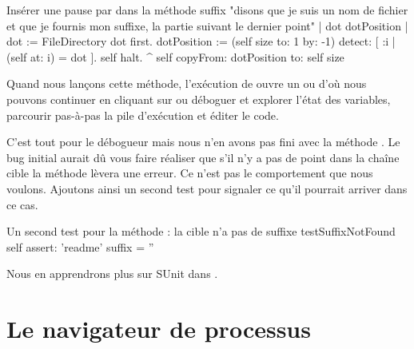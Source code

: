 \documentclass[a4paper,10pt,twoside]{book}
\begin{document}
\needspace{11ex}
\begin{method}[suffix]{Insérer une pause par  dans la méthode }
suffix
	"disons que je suis un nom de fichier et que je fournis mon suffixe, la partie suivant le dernier point"
	| dot dotPosition |
	dot := FileDirectory dot first.
	dotPosition := (self size to: 1 by: -1) detect: [ :i | (self at: i) = dot ].
	self halt.
	^ self copyFrom: dotPosition to: self size 
\end{method}

Quand nous lançons cette méthode, l'exécution de  ouvre 
un  ou \emph{} d'où nous pouvons continuer 
en cliquant sur 
ou déboguer et explorer l'état des variables, parcourir pas-à-pas la pile d'exécution et éditer le code.

C'est tout pour le débogueur mais nous n'en avons pas fini avec la méthode .
Le bug initial aurait dû vous faire réaliser que s'il n'y a pas de point dans la chaîne 
cible la méthode  lèvera une erreur.
Ce n'est pas le comportement que nous voulons. Ajoutons ainsi un second test
pour signaler ce qu'il pourrait arriver dans ce cas.  

\begin{method}[testNoSuffix]{Un second test pour la méthode : la cible n'a pas de suffixe}
testSuffixNotFound
	self assert: 'readme' suffix = ''
\end{method}


Nous en apprendrons plus sur SUnit dans .


\section{Le navigateur de processus}
\end{document}
